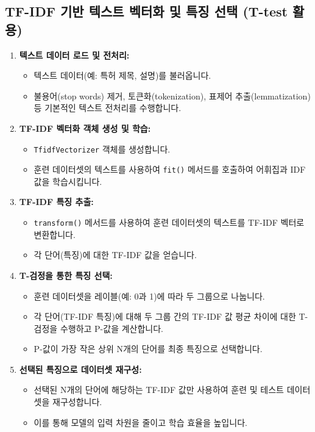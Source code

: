 \documentclass[11pt,a4paper]{book}
\theoremstyle{definition}
\begin{document}
\subsection{TF-IDF 기반 텍스트 벡터화 및 특징 선택 (T-test 활용)}
\begin{enumerate}
    \item \textbf{텍스트 데이터 로드 및 전처리:}
    \begin{itemize}
        \item 텍스트 데이터(예: 특허 제목, 설명)를 불러옵니다.
        \item 불용어(stop words) 제거, 토큰화(tokenization), 표제어 추출(lemmatization) 등 기본적인 텍스트 전처리를 수행합니다.
    \end{itemize}
    \item \textbf{TF-IDF 벡터화 객체 생성 및 학습:}
    \begin{itemize}
        \item \texttt{TfidfVectorizer} 객체를 생성합니다.
        \item 훈련 데이터셋의 텍스트를 사용하여 \texttt{fit()} 메서드를 호출하여 어휘집과 IDF 값을 학습시킵니다.
    \end{itemize}
    \item \textbf{TF-IDF 특징 추출:}
    \begin{itemize}
        \item \texttt{transform()} 메서드를 사용하여 훈련 데이터셋의 텍스트를 TF-IDF 벡터로 변환합니다.
        \item 각 단어(특징)에 대한 TF-IDF 값을 얻습니다.
    \end{itemize}
    \item \textbf{T-검정을 통한 특징 선택:}
    \begin{itemize}
        \item 훈련 데이터셋을 레이블(예: 0과 1)에 따라 두 그룹으로 나눕니다.
        \item 각 단어(TF-IDF 특징)에 대해 두 그룹 간의 TF-IDF 값 평균 차이에 대한 T-검정을 수행하고 P-값을 계산합니다.
        \item P-값이 가장 작은 상위 N개의 단어를 최종 특징으로 선택합니다.
    \end{itemize}
    \item \textbf{선택된 특징으로 데이터셋 재구성:}
    \begin{itemize}
        \item 선택된 N개의 단어에 해당하는 TF-IDF 값만 사용하여 훈련 및 테스트 데이터셋을 재구성합니다.
        \item 이를 통해 모델의 입력 차원을 줄이고 학습 효율을 높입니다.
    \end{itemize}
\end{enumerate}
\end{document}
